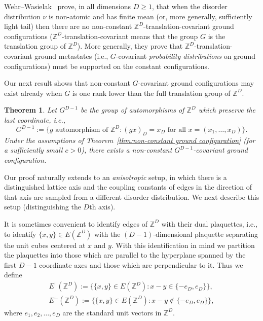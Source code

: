 \documentclass[11pt, reqno]{amsart}
\newtheorem{theorem}{Theorem}[section]
\newcommand{\Z}{\mathbb{Z}}
\numberwithin{equation}{section}
\begin{document}
Wehr--Wasielak~\cite{WW16} prove, in all dimensions $D\ge 1$, that when the disorder distribution $\nu$ is non-atomic and has finite mean (or, more generally, sufficiently light tail) then there are no non-constant $\Z^D$-translation-covariant ground configurations ($\Z^D$-translation-covariant means that the group $G$ is the translation group of $\Z^D$). More generally, they prove that $\Z^D$-translation-covariant ground metastates (i.e., $G$-covariant \emph{probability distributions} on ground configurations) must be supported on the constant configurations.

Our next result shows that non-constant $G$-covariant ground configurations may exist already when $G$ is one rank lower than the full translation group of $\Z^D$.
\begin{theorem}\label{thm:covariant ground configurations isotropic}
Let $G^{D-1}$ be the group of automorphisms of $\Z^D$ which preserve the last coordinate, i.e.,
\begin{equation}\label{eq:G D-1 automorphism group}
G^{D-1}:=\{g\text{ automorphism of $\Z^D$}\colon (gx)_D=x_D\text{ for all }x=(x_1,\ldots, x_D)\}.
\end{equation}
Under the assumptions of Theorem~\ref{thm:non-constant ground configuration} (for a sufficiently small $c>0$), there exists a non-constant $G^{D-1}$-covariant ground configuration.
\end{theorem}

\smallskip
{}
Our proof naturally extends to an \emph{anisotropic} setup, in which there is a distinguished lattice axis and the coupling constants of edges in the direction of that axis are sampled from a different disorder distribution. We next describe this setup (distinguishing the $D$th axis).

It is sometimes convenient to identify edges of $\Z^D$ with their dual plaquettes, i.e., to identify $\{x,y\}\in E(\Z^D)$ with the $(D-1)$-dimensional plaquette separating the unit cubes centered at $x$ and $y$. With this identification in mind we partition the plaquettes into those which are parallel to the hyperplane spanned by the first $D-1$ coordinate axes and those which are perpendicular to it. Thus we define
\begin{equation}
\begin{split}
E^{\parallel}(\Z^D):=\{\{x,y\}\in E(\Z^D)\colon x-y\in\{-e_D, e_D\}\},\\
E^{\perp}(\Z^D):=\{\{x,y\}\in E(\Z^D)\colon x-y\notin\{-e_D, e_D\}\},
\end{split}\label{eq:parallel and perpendicular edges}
\end{equation}
where $e_1,e_2,\ldots,e_D$ are the standard unit vectors in $\Z^D$.
\end{document}
